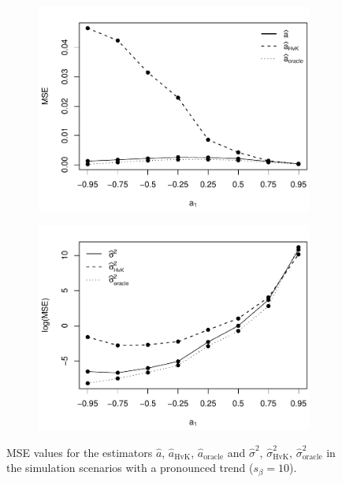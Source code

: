\begin{figure}[t!]
\begin{subfigure}[b]{0.475\textwidth}
\includegraphics[width=\textwidth]{Plots/MSE_a1_T=500_slope=10_(q,r,M1,M2)=(25,10,20,30).pdf}
\end{subfigure}\hspace{0.25cm}
\begin{subfigure}[b]{0.475\textwidth}
\includegraphics[width=\textwidth]{Plots/MSE_lrv_T=500_slope=10_(q,r,M1,M2)=(25,10,20,30).pdf}
\end{subfigure}
\caption{MSE values for the estimators $\widehat{a}$, $\widehat{a}_{\text{HvK}}$, $\widehat{a}_{\text{oracle}}$ and $\widehat{\sigma}^2$, $\widehat{\sigma}^2_{\text{HvK}}$, $\widehat{\sigma}^2_{\text{oracle}}$ in the simulation scenarios with a pronounced trend ($s_\beta=10$).}\label{fig:MSE_slope10}
\end{figure}



